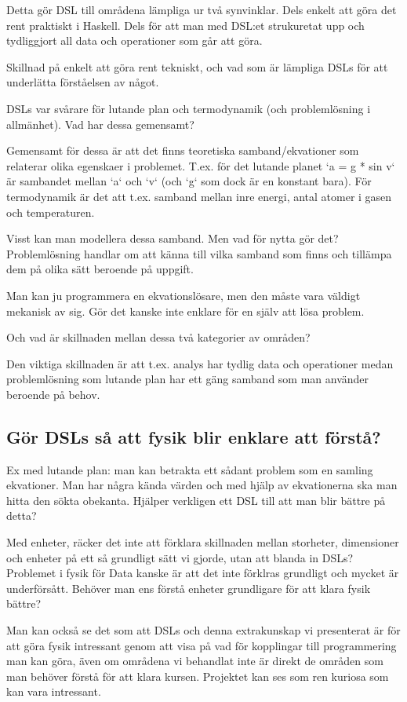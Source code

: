 \begin{binge}
Detta gör DSL till områdena lämpliga ur två synvinklar. Dels enkelt att göra
det rent praktiskt i Haskell. Dels för att man med DSL:et strukuretat upp och
tydliggjort all data och operationer som går att göra.

Skillnad på enkelt att göra rent tekniskt, och vad som är lämpliga DSLs för att
underlätta förståelsen av något.

\newpage

DSLs var svårare för lutande plan och termodynamik (och problemlösning i
allmänhet). Vad har dessa gemensamt?

Gemensamt för dessa är att det finns teoretiska samband/ekvationer som
relaterar olika egenskaer i problemet. T.ex. för det lutande planet `a = g *
sin v` är sambandet mellan `a` och `v` (och `g` som dock är en konstant bara).
För termodynamik är det att t.ex. samband mellan inre energi, antal atomer i
gasen och temperaturen.

Visst kan man modellera dessa samband. Men vad för nytta gör det?
Problemlösning handlar om att känna till vilka samband som finns och tillämpa
dem på olika sätt beroende på uppgift.

Man kan ju programmera en ekvationslösare, men den måste vara väldigt mekanisk
av sig. Gör det kanske inte enklare för en själv att lösa problem.

Och vad är skillnaden mellan dessa två kategorier av områden?

Den viktiga skillnaden är att t.ex. analys har tydlig data och operationer
medan problemlösning som lutande plan har ett gäng samband som man använder
beroende på behov.

\subsection{Gör DSLs så att fysik blir enklare att förstå?}

Ex med lutande plan: man kan betrakta ett sådant problem som en samling
ekvationer. Man har några kända värden och med hjälp av ekvationerna ska man
hitta den sökta obekanta. Hjälper verkligen ett DSL till att man blir bättre på
detta?

Med enheter, räcker det inte att förklara skillnaden mellan storheter,
dimensioner och enheter på ett så grundligt sätt vi gjorde, utan att blanda in
DSLs? Problemet i fysik för Data kanske är att det inte förklras grundligt och
mycket är underförsått. Behöver man ens förstå enheter grundligare för att
klara fysik bättre?

Man kan också se det som att DSLs och denna extrakunskap vi presenterat är för
att göra fysik intressant genom att visa på vad för kopplingar till
programmering man kan göra, även om områdena vi behandlat inte är direkt de
områden som man behöver förstå för att klara kursen. Projektet kan ses som ren
kuriosa som kan vara intressant.

\end{binge}
